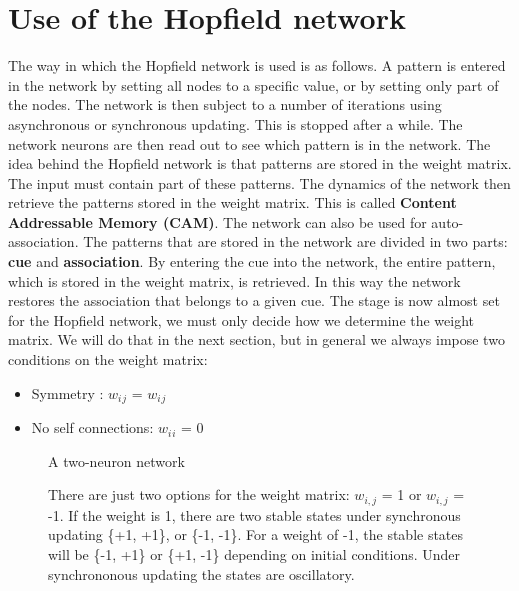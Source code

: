 \section {Use of the Hopfield network}
The way in which the Hopfield network is used is as follows. 
A pattern is entered in the network by setting all nodes to a specific value, or by setting
only part of the nodes. The network is then subject to a number of iterations
using asynchronous or synchronous updating. This is stopped after a while.
The network neurons are then read out to see which pattern is in the network.
The idea behind the Hopfield network is that patterns are stored in the
weight matrix. The input must contain part of these patterns. The dynamics
of the network then retrieve the patterns stored in the weight matrix. This is
called \textbf{Content Addressable Memory (CAM)}. The network can also be used for
auto-association. The patterns that are stored in the network are divided in two
parts: \textbf{cue} and \textbf{association}. By entering the cue into the network,
the entire pattern, which is stored in the weight matrix, is retrieved. In this
way the network restores the association that belongs to a given cue.
The stage is now almost set for the Hopfield network, we must only decide
how we determine the weight matrix. We will do that in the next section, but
in general we always impose two conditions on the weight matrix:
\begin{itemize}
\item Symmetry : $w$$_i$$_j$ = $w$$_i$$_j$
\item No self connections: $w$$_i$$_i$ = 0
\end{itemize}

\begin{figure}
\centering
\caption{A two-neuron network}
\caption{There are just two options for the weight
matrix: $w_{i,j}$ = 1  or $w_{i,j}$ = -1. If the weight is 1, there are two stable
states under synchronous updating \{+1, +1\}, or \{-1, -1\}. For a weight of -1,
the stable states will be \{-1, +1\} or \{+1, -1\} depending on initial conditions.
Under synchrononous updating the states are oscillatory.}
\label{fig:a_two_neuron_network}
\end{figure}


